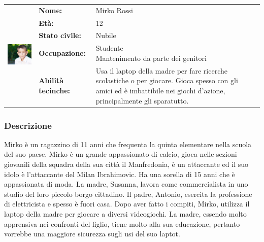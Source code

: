 \documentclass[../Report.tex]{subfiles}
\begin{document}
    \vspace{1.5cm}

    \begin{table}[H]
        \begin{tabular}{|c|l|p{7cm}|}
            \hline
            \multirow{5}{*}{\includegraphics[width=5cm, height=5cm]{Mirko.jpg}} 
                & \textbf{Nome:} & Mirko Rossi\\ \cmidrule{2-3}
            & \textbf{Età:} & 12 \\ \cmidrule{2-3}
            & \textbf{Stato civile:} & Nubile \\ \cmidrule{2-3}
            & \textbf{Occupazione:} & \makecell{Studente \\ Mantenimento da parte dei genitori} \\ \cmidrule{2-3}
            & \textbf{Abilità tecinche:} & Usa il laptop della madre per fare ricerche scolastiche o per giocare. Gioca spesso con gli amici ed è imbattibile nei giochi d'azione, principalmente gli sparatutto. \\
            \hline
        \end{tabular}
    \end{table}

    \subsubsection{Descrizione}
    Mirko è un ragazzino di 11 anni che frequenta la quinta elementare nella scuola del suo paese. Mirko è un grande appassionato di calcio, gioca nelle sezioni giovanili della squadra della sua città il Manfredonia, è un attaccante ed il suo idolo è l'attaccante del Milan Ibrahimovic.  Ha una sorella di 15 anni che è appassionata di moda. La madre, Susanna, lavora come commercialista in uno studio del loro piccolo borgo cittadino. Il padre, Antonio, esercita la professione di elettricista e spesso è fuori casa. Dopo aver fatto i compiti, Mirko, utilizza il laptop della madre per giocare a diversi videogiochi. La madre, essendo molto apprensiva nei confronti del figlio, tiene molto alla sua educazione, pertanto vorrebbe una maggiore sicurezza sugli usi del suo laptot.
\end{document}
